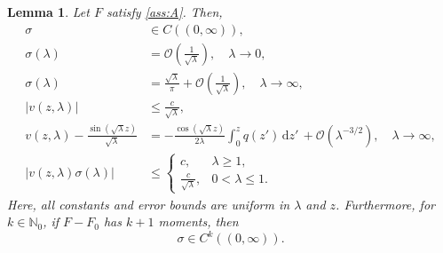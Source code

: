 \documentclass[11pt,twoside,reqno,centertags]{amsart}
\newtheorem{lemma}[theorem]{Lemma}
\theoremstyle{definition}
\newcommand{\N}{\mathbb N}
\newcommand{\dd}{\mathrm d}
\begin{document}
\begin{lemma}\label{lem:spectral_results}
	Let $F$ satisfy \eqref{ass:A}. Then,
	\begin{align}
		\sigma &\in C((0,\infty)),\label{eq:sigma_continuous}\\
		\sigma(\lambda) &= \mathcal O\left(\frac{1}{\sqrt\lambda}\right),\quad \lambda\to 0,\label{eq:sigma_asymptotics_zero}\\
		\sigma(\lambda) &= \frac{\sqrt\lambda}{\pi}+\mathcal O\left(\frac{1}{\sqrt\lambda}\right),\quad \lambda\to\infty,\label{eq:sigma_asymptotics_infinity}\\
		|v(z,\lambda)| &\le \frac{c}{\sqrt\lambda},\label{eq:est_v}\\
		v(z,\lambda)-\frac{\sin(\sqrt\lambda z)}{\sqrt\lambda} &= -\frac{\cos(\sqrt\lambda z)}{2\lambda}\int_0^z q(z')\,\dd z'\, + \mathcal O(\lambda^{-3/2}),\quad \lambda\to\infty,\label{eq:asymp_v-v0}\\
		|v(z,\lambda)\sigma(\lambda)| &\le \begin{cases}c,&\lambda\ge1,\\\frac{c}{\sqrt\lambda},&0<\lambda\le1.\end{cases}\label{eq:est_v*sigma}
	\end{align}
	Here, all constants and error bounds are uniform in $\lambda$ and $z$. Furthermore, for $k\in\N_0$, if $F-F_0$ has $k+1$ moments, then
	\begin{equation}\label{eq:sigma_smooth}
		\sigma\in C^k((0,\infty)).
	\end{equation}
\end{lemma}
\end{document}
